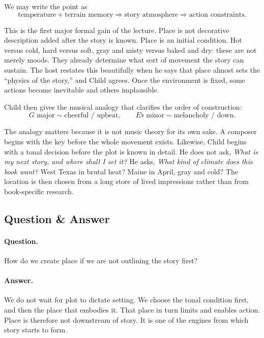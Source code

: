 We may write the point as
\begin{equation}
\text{temperature} + \text{terrain memory} \Longrightarrow \text{story atmosphere} \Longrightarrow \text{action constraints}.
\end{equation}

This is the first major formal gain of the lecture. Place is not decorative description added after the story is known. Place is an initial condition. Hot versus cold, hard versus soft, gray and misty versus baked and dry: these are not merely moods. They already determine what sort of movement the story can sustain. The host restates this beautifully when he says that place almost sets the ``physics of the story,'' and Child agrees. Once the environment is fixed, some actions become inevitable and others implausible.

Child then gives the musical analogy that clarifies the order of construction:
\begin{equation}
G\text{ major} \sim \text{cheerful / upbeat}, \qquad
E\flat \text{ minor} \sim \text{melancholy / down}.
\end{equation}

The analogy matters because it is not music theory for its own sake. A composer begins with the key before the whole movement exists. Likewise, Child begins with a tonal decision before the plot is known in detail. He does not ask, \emph{What is my next story, and where shall I set it?} He asks, \emph{What kind of climate does this book want?} West Texas in brutal heat? Maine in April, gray and cold? The location is then chosen from a long store of lived impressions rather than from book-specific research.

\subsection{Question \& Answer}

\paragraph{Question.} How do we create place if we are not outlining the story first?

\paragraph{Answer.} We do not wait for plot to dictate setting. We choose the tonal condition first, and then the place that embodies it. That place in turn limits and enables action. Place is therefore not downstream of story. It is one of the engines from which story starts to form.


